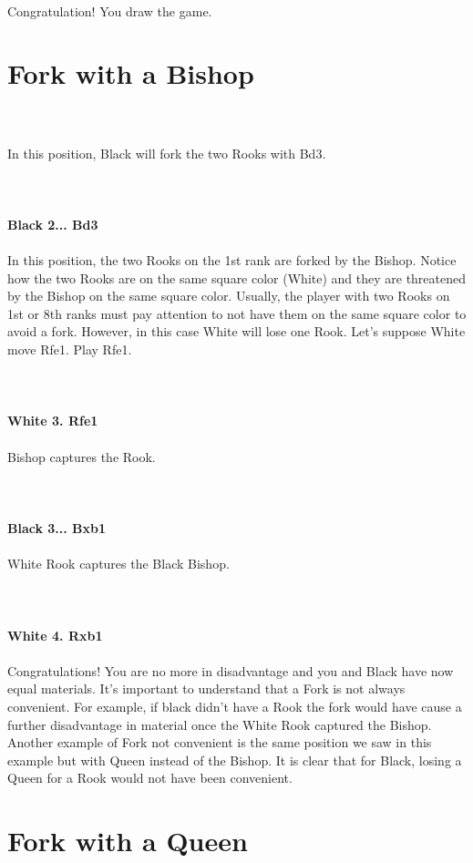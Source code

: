 \documentclass{article}
\begin{document}
\\
Congratulation! You draw the game.\section{ Fork with a Bishop}

\\
\\
In this position, Black will fork the two Rooks with Bd3.\\
\\

\\
\\
\textbf{Black 2... Bd3}\\
\\
In this position, the two Rooks on the 1st rank are forked by the Bishop. Notice how the two Rooks are on the same square color (White) and they are threatened by the Bishop on the same square color. Usually, the player with two Rooks on 1st or 8th ranks must pay attention to not have them on the same square color to avoid a fork. However, in this case White will lose one Rook. Let's suppose White move Rfe1. Play Rfe1.\\
\\

\\
\\
\textbf{White 3. Rfe1}\\
\\
Bishop captures the Rook.\\
\\

\\
\\
\textbf{Black 3... Bxb1}\\
\\
White Rook captures the Black Bishop.\\
\\

\\
\\
\textbf{White 4. Rxb1}\\
\\
Congratulations! You are no more in disadvantage and you and Black have now equal materials. It's important to understand that a Fork is not always convenient. For example, if black didn't have a Rook the fork would have cause a further disadvantage in material once the White Rook captured the Bishop. Another example of Fork not convenient is the same position we saw in this example but with Queen instead of the Bishop. It is clear that for Black, losing a Queen for a Rook would not have been convenient.\section{ Fork with a Queen}
\end{document}
